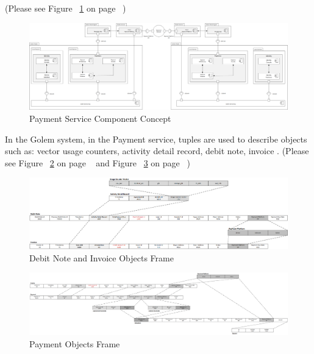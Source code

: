 (Please see Figure ~\ref{fig:PSCC} on page ~\pageref{fig:PSCC})

\begin{figure}[H]
    \centering
    \includegraphics[width=18cm,angle=0]{./diag/Reference/PaymentService-Reference.png}
	\caption{Payment Service Component Concept}
    \label{fig:PSCC}
\end{figure}



In the Golem system, in the Payment service, tuples are used to describe objects such as:
vector usage counters, activity detail record, debit note, invoice . 
(Please see Figure ~\ref{fig:PF1} on page ~\pageref{fig:PF1} and Figure ~\ref{fig:PF2} on page ~\pageref{fig:PF2})

\begin{figure}[H]
    \centering
    \includegraphics[width=17cm,angle=0]{./diag/Reference/PaymentFrame-1-Reference.png}
	\caption{Debit Note and Invoice Objects Frame}
    \label{fig:PF1}
\end{figure}

\begin{figure}[H]
    \centering
    \includegraphics[width=19cm,angle=0]{./diag/Reference/PaymentFrame-2-Reference.png}
	\caption{Payment Objects Frame}
    \label{fig:PF2}
\end{figure}


